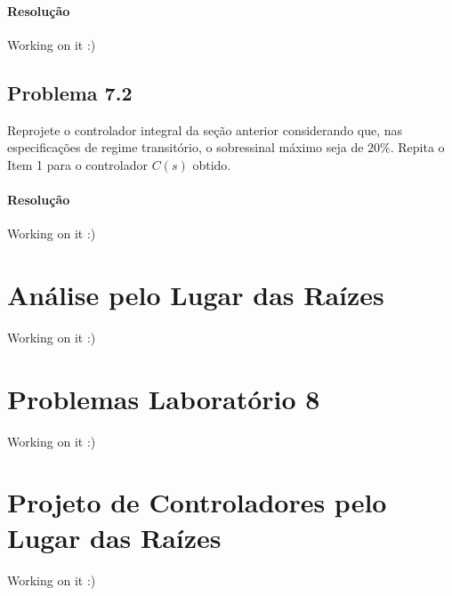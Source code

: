 \documentclass[
]{book}
\theoremstyle{definition}
\theoremstyle{definition}
\theoremstyle{definition}
\theoremstyle{remark}
\begin{document}
\hypertarget{resoluuxe7uxe3o}{%
\subsubsection*{Resolução}\label{resoluuxe7uxe3o}}

Working on it :)

\hypertarget{problema-7.2}{%
\section*{Problema 7.2}\label{problema-7.2}}

Reprojete o controlador integral da seção anterior considerando que, nas especificações de regime transitório, o sobressinal máximo seja de \(20\%\). Repita o Item 1 para o controlador \(C(s)\) obtido.

\hypertarget{resoluuxe7uxe3o-1}{%
\subsubsection*{Resolução}\label{resoluuxe7uxe3o-1}}

Working on it :)

\hypertarget{anuxe1lise-pelo-lugar-das-rauxedzes}{%
\chapter{Análise pelo Lugar das Raízes}\label{anuxe1lise-pelo-lugar-das-rauxedzes}}

Working on it :)

\hypertarget{problemas-laboratuxf3rio-8}{%
\chapter*{Problemas Laboratório 8}\label{problemas-laboratuxf3rio-8}}

Working on it :)

\hypertarget{projeto-de-controladores-pelo-lugar-das-rauxedzes}{%
\chapter{Projeto de Controladores pelo Lugar das Raízes}\label{projeto-de-controladores-pelo-lugar-das-rauxedzes}}

Working on it :)
\end{document}
